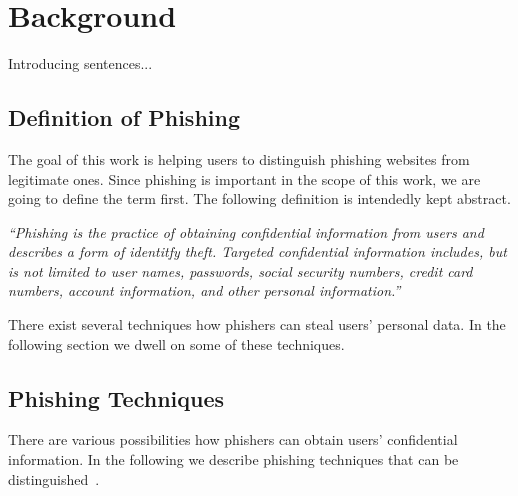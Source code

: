 \section{Background}
\label{s:background}
Introducing sentences...

\subsection{Definition of Phishing}
\label{s:phishing_def}
The goal of this work is helping users to distinguish phishing websites from legitimate ones. Since phishing is important in the scope of this work, we are going to define the term first. The following definition is intendedly kept abstract.

\begin{center}
\textit{``Phishing is the practice of obtaining confidential information from users and describes a form of identitfy theft. Targeted confidential information includes, but is not limited to user names, passwords, social security numbers, credit card numbers, account information, and other personal information.''}
\end{center}

There exist several techniques how phishers can steal users' personal data. In the following section we dwell on some of these techniques. 

\subsection{Phishing Techniques}
\label{s:phishing_techs}
There are various possibilities how phishers can obtain users' confidential information. In the following we describe phishing techniques that can be distinguished~\cite{emigh2005online}.

